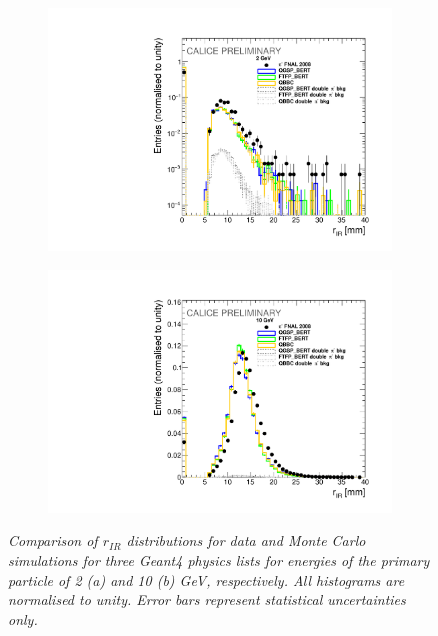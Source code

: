 \begin{figure}
	\centering
	\begin{subfigure}{0.5\textwidth}
		\centering
		\includegraphics[width=.90\linewidth]{ECAL/plots/r-ir-2.pdf}
		\caption{\label{fig:rir2F} }
	\end{subfigure}%
	\begin{subfigure}{0.5\textwidth}
		\centering
		\includegraphics[width=.90\linewidth]{ECAL/plots/r-ir-10.pdf}
		\caption{\label{fig:rir10F} }
	\end{subfigure}
	\caption{\label{fig:rirexampleF} \sl %
		Comparison of $r_{IR}$ distributions for data and Monte Carlo simulations for three {\sc Geant}4 physics lists for energies of the primary particle of 2 (a) and 10 (b) GeV, respectively. All histograms are normalised to unity. Error bars represent statistical uncertainties only.}
\end{figure}


